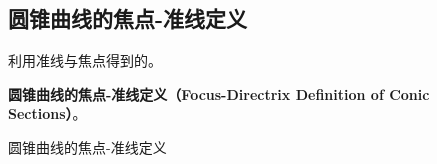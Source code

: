 

\subsection{圆锥曲线的焦点-准线定义}

利用准线与焦点得到的。

\textbf{圆锥曲线的焦点-准线定义（Focus-Directrix Definition of Conic Sections）}。

\begin{definition}{圆锥曲线的焦点-准线定义}

\end{definition}